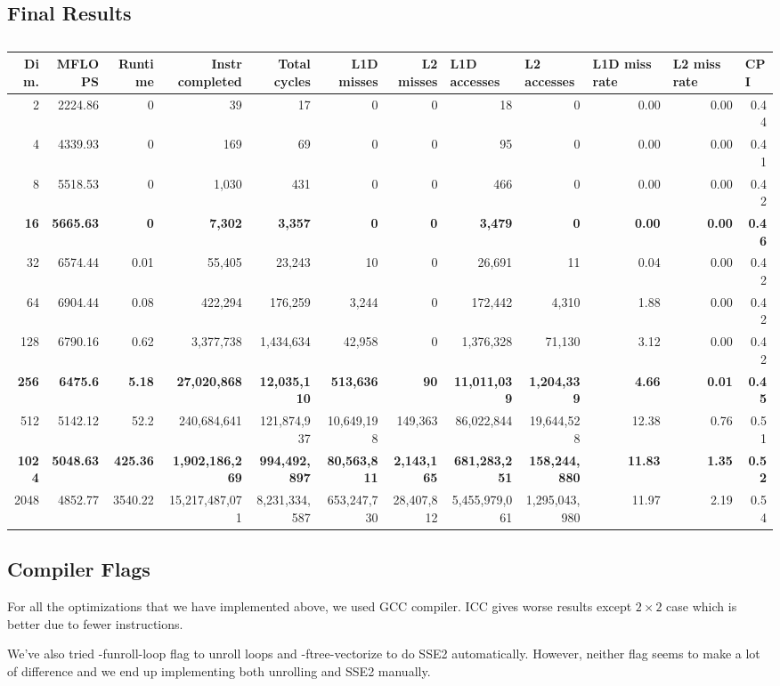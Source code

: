 \documentclass{article}
\begin{document}
\subsection{Final Results}
\begin{table}[htbp]
\caption{}
\begin{tabular}{|r|r|r|r|r|r|r|r|r|r|r|r|}
\hline
Dim. &   MFLOPS &     Runtime & Instr completed & Total cycles & L1D misses & L2 misses & \multicolumn{1}{l|}{L1D accesses} & \multicolumn{1}{l|}{ L2 accesses} & \multicolumn{1}{l|}{L1D miss rate} & \multicolumn{1}{l|}{L2 miss rate} & \multicolumn{1}{l|}{CPI} \\ \hline
2 & 2224.86 & 0 & 39 & 17 & 0 & 0 & 18 & 0 & 0.00 & 0.00 & 0.44 \\ \hline
4 & 4339.93 & 0 & 169 & 69 & 0 & 0 & 95 & 0 & 0.00 & 0.00 & 0.41 \\ \hline
8 & 5518.53 & 0 & 1,030 & 431 & 0 & 0 & 466 & 0 & 0.00 & 0.00 & 0.42 \\ \hline
\textbf{16} & \textbf{5665.63} & \textbf{0} & \textbf{7,302} & \textbf{3,357} & \textbf{0} & \textbf{0} & \textbf{3,479} & \textbf{0} & \textbf{0.00} & \textbf{0.00} & \textbf{0.46} \\ \hline
32 & 6574.44 & 0.01 & 55,405 & 23,243 & 10 & 0 & 26,691 & 11 & 0.04 & 0.00 & 0.42 \\ \hline
64 & 6904.44 & 0.08 & 422,294 & 176,259 & 3,244 & 0 & 172,442 & 4,310 & 1.88 & 0.00 & 0.42 \\ \hline
128 & 6790.16 & 0.62 & 3,377,738 & 1,434,634 & 42,958 & 0 & 1,376,328 & 71,130 & 3.12 & 0.00 & 0.42 \\ \hline
\textbf{256} & \textbf{6475.6} & \textbf{5.18} & \textbf{27,020,868} & \textbf{12,035,110} & \textbf{513,636} & \textbf{90} & \textbf{11,011,039} & \textbf{1,204,339} & \textbf{4.66} & \textbf{0.01} & \textbf{0.45} \\ \hline
512 & 5142.12 & 52.2 & 240,684,641 & 121,874,937 & 10,649,198 & 149,363 & 86,022,844 & 19,644,528 & 12.38 & 0.76 & 0.51 \\ \hline
\textbf{1024} & \textbf{5048.63} & \textbf{425.36} & \textbf{1,902,186,269} & \textbf{994,492,897} & \textbf{80,563,811} & \textbf{2,143,165} & \textbf{681,283,251} & \textbf{158,244,880} & \textbf{11.83} & \textbf{1.35} & \textbf{0.52} \\ \hline
2048 & 4852.77 & 3540.22 & 15,217,487,071 & 8,231,334,587 & 653,247,730 & 28,407,812 & 5,455,979,061 & 1,295,043,980 & 11.97 & 2.19 & 0.54 \\ \hline
\end{tabular}
\label{}
\end{table}


\subsection{Compiler Flags}
For all the optimizations that we have implemented above, we used GCC compiler.  ICC gives worse results except $2 \times 2$ case which is better due to fewer instructions.

We've also tried -funroll-loop flag to unroll loops and -ftree-vectorize to do SSE2 automatically.  However, neither flag seems to make a lot of difference and we end up implementing both unrolling and SSE2 manually.
\end{document}
